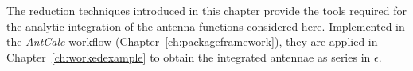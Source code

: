 The reduction techniques introduced in this chapter provide the tools
required for the analytic integration of the antenna functions considered here.
Implemented in the \textit{AntCalc} workflow (Chapter~\ref{ch:packageframework}), they are
applied in Chapter~\ref{ch:workedexample} to obtain the integrated antennae as series in $\epsilon$.
